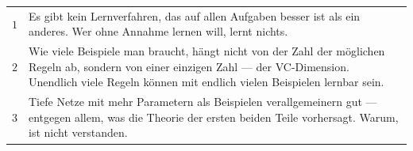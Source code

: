\begin{merksatz}
\begin{center}
{\small
\renewcommand{\arraystretch}{1.55}
\begin{tabular}{@{}P{1.0cm}P{7.4cm}@{}}
\toprule
$1$ & Es gibt kein Lernverfahren, das auf allen Aufgaben besser ist als ein anderes. Wer ohne Annahme lernen will, lernt nichts. \\
$2$ & Wie viele Beispiele man braucht, hängt nicht von der Zahl der möglichen Regeln ab, sondern von einer einzigen Zahl --- der VC-Dimension. Unendlich viele Regeln können mit endlich vielen Beispielen lernbar sein. \\
$3$ & Tiefe Netze mit mehr Parametern als Beispielen verallgemeinern gut --- entgegen allem, was die Theorie der ersten beiden Teile vorhersagt. Warum, ist nicht verstanden. \\
\bottomrule
\end{tabular}}
\end{center}

\begin{center}
\begin{minipage}{0.88\textwidth}
\end{minipage}
\end{center}
\end{merksatz}

